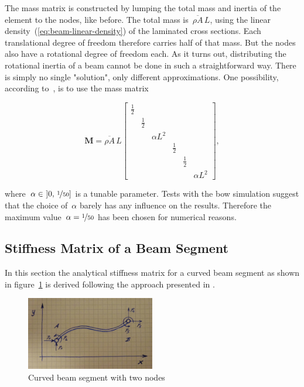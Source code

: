 The mass matrix is constructed by lumping the total mass and inertia of the element to the nodes, like before.
The total mass is~$\overline{\rho A}\,L$, using the linear density~(\ref{eq:beam-linear-density}) of the laminated cross sections.
Each translational degree of freedom therefore carries half of that mass. But the nodes also have a rotational degree of freedom each.
As it turns out, distributing the rotational inertia of a beam cannot be done in such a straightforward way.
There is simply no single "solution", only different approximations.
One possibility, according to~\cite{bib:beam_element_2}, is to use the mass matrix

\begin{equation}
\boldsymbol{M} = 
\overline{\rho A}\,L
\begin{bmatrix}
\frac{1}{2}\\
& \frac{1}{2}\\
&& \alpha L^2\\
&&& \frac{1}{2}\\
&&&& \frac{1}{2}\\
&&&&& \alpha L^2
\end{bmatrix},
\end{equation}

where~$\alpha \in\ ]0,\,\nicefrac{1}{50}]$ is a tunable parameter. Tests with the bow simulation suggest that the choice of~$\alpha$ barely has any influence on the results. Therefore the maximum value~$\alpha = \nicefrac{1}{50}$ has been chosen for numerical reasons.

\newpage
\subsection{Stiffness Matrix of a Beam Segment}

In this section the analytical stiffness matrix for a curved beam segment as shown in figure~\ref{fig:beam-linear-1} is derived following the approach presented in \cite{bib:curved-beam-stiffness-matrix}.

\begin{figure}[h]
\centering
\includegraphics[width=0.5\textwidth]{figures/elements/beam-linear-1}
\caption{Curved beam segment with two nodes}
\label{fig:beam-linear-1}
\end{figure}


